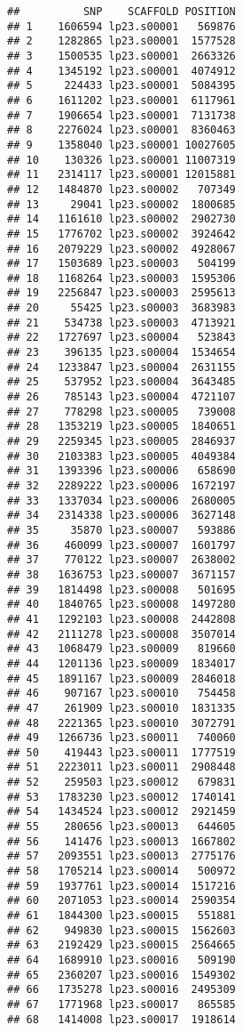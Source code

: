 \documentclass[
]{article}
\begin{document}
\begin{verbatim}
##          SNP    SCAFFOLD POSITION
## 1    1606594 lp23.s00001   569876
## 2    1282865 lp23.s00001  1577528
## 3    1500535 lp23.s00001  2663326
## 4    1345192 lp23.s00001  4074912
## 5     224433 lp23.s00001  5084395
## 6    1611202 lp23.s00001  6117961
## 7    1906654 lp23.s00001  7131738
## 8    2276024 lp23.s00001  8360463
## 9    1358040 lp23.s00001 10027605
## 10    130326 lp23.s00001 11007319
## 11   2314117 lp23.s00001 12015881
## 12   1484870 lp23.s00002   707349
## 13     29041 lp23.s00002  1800685
## 14   1161610 lp23.s00002  2902730
## 15   1776702 lp23.s00002  3924642
## 16   2079229 lp23.s00002  4928067
## 17   1503689 lp23.s00003   504199
## 18   1168264 lp23.s00003  1595306
## 19   2256847 lp23.s00003  2595613
## 20     55425 lp23.s00003  3683983
## 21    534738 lp23.s00003  4713921
## 22   1727697 lp23.s00004   523843
## 23    396135 lp23.s00004  1534654
## 24   1233847 lp23.s00004  2631155
## 25    537952 lp23.s00004  3643485
## 26    785143 lp23.s00004  4721107
## 27    778298 lp23.s00005   739008
## 28   1353219 lp23.s00005  1840651
## 29   2259345 lp23.s00005  2846937
## 30   2103383 lp23.s00005  4049384
## 31   1393396 lp23.s00006   658690
## 32   2289222 lp23.s00006  1672197
## 33   1337034 lp23.s00006  2680005
## 34   2314338 lp23.s00006  3627148
## 35     35870 lp23.s00007   593886
## 36    460099 lp23.s00007  1601797
## 37    770122 lp23.s00007  2638002
## 38   1636753 lp23.s00007  3671157
## 39   1814498 lp23.s00008   501695
## 40   1840765 lp23.s00008  1497280
## 41   1292103 lp23.s00008  2442808
## 42   2111278 lp23.s00008  3507014
## 43   1068479 lp23.s00009   819660
## 44   1201136 lp23.s00009  1834017
## 45   1891167 lp23.s00009  2846018
## 46    907167 lp23.s00010   754458
## 47    261909 lp23.s00010  1831335
## 48   2221365 lp23.s00010  3072791
## 49   1266736 lp23.s00011   740060
## 50    419443 lp23.s00011  1777519
## 51   2223011 lp23.s00011  2908448
## 52    259503 lp23.s00012   679831
## 53   1783230 lp23.s00012  1740141
## 54   1434524 lp23.s00012  2921459
## 55    280656 lp23.s00013   644605
## 56    141476 lp23.s00013  1667802
## 57   2093551 lp23.s00013  2775176
## 58   1705214 lp23.s00014   500972
## 59   1937761 lp23.s00014  1517216
## 60   2071053 lp23.s00014  2590354
## 61   1844300 lp23.s00015   551881
## 62    949830 lp23.s00015  1562603
## 63   2192429 lp23.s00015  2564665
## 64   1689910 lp23.s00016   509190
## 65   2360207 lp23.s00016  1549302
## 66   1735278 lp23.s00016  2495309
## 67   1771968 lp23.s00017   865585
## 68   1414008 lp23.s00017  1918614

\end{verbatim}
\end{document}
